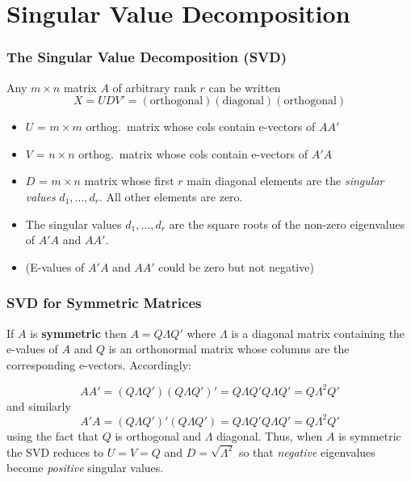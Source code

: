 \section{Singular Value Decomposition}
\begin{frame}
  \frametitle{The Singular Value Decomposition (SVD)}
  
Any $m \times n$ matrix $A$ of arbitrary rank $r$ can be written 
	$$X = UDV' = (\mbox{orthogonal})(\mbox{diagonal})(\mbox{orthogonal})$$
  \vspace{-2em}
	\begin{itemize}
	 	\item $U$ = $m\times m$ orthog.\ matrix whose cols contain e-vectors of $AA'$
	 	\item $V$ = $n\times n$ orthog.\ matrix whose cols contain e-vectors of $A'A$
	 	\item $D$ = $m\times n$ matrix whose first $r$ main diagonal elements are the  \emph{singular values} $d_1, \hdots, d_r$. All other elements are zero.
    \item The singular values $d_1, \hdots, d_r$ are the square roots of the non-zero eigenvalues of $A'A$ \alert{and} $AA'$.
    \item (E-values of $A'A$ and $AA'$ could be zero but not negative)
	 \end{itemize} 
\end{frame}
\begin{frame}
  \frametitle{SVD for Symmetric Matrices}
  
If $A$ is \textbf{symmetric} then $A = Q\Lambda Q'$ where $\Lambda$ is a diagonal matrix containing the e-values of $A$ and $Q$ is an orthonormal matrix whose columns are the corresponding e-vectors. Accordingly:

  \[
    AA' = (Q\Lambda Q')(Q\Lambda Q')' = Q \Lambda Q' Q \Lambda Q' = Q \Lambda^2 Q'
  \]
  and similarly
  \[
    A'A = (Q\Lambda Q')'(Q\Lambda Q') = Q \Lambda Q' Q \Lambda Q' = Q \Lambda^2 Q'
  \]
  using the fact that $Q$ is orthogonal and $\Lambda$ diagonal.
  Thus, when $A$ is symmetric the SVD reduces to $U = V = Q$ and $D = \sqrt{\Lambda^2}$ so that \emph{negative} eigenvalues become \emph{positive} singular values.
\end{frame}

